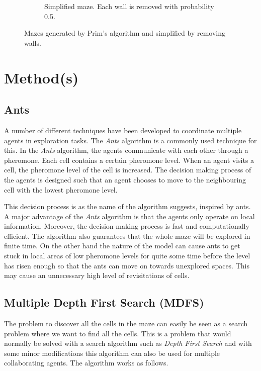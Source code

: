 \documentclass{article}
\begin{document}
\begin{figure}[H]
\begin{subfigure}[b]{0.3\textwidth}
        \caption{Simplified maze. Each wall is removed with probability 0.5.}
    \end{subfigure}
    \caption{Mazes generated by Prim's algorithm and simplified by removing
    walls.}
\end{figure}

\section{Method(s)}

\subsection{Ants}
A number of different techniques have been developed to coordinate multiple
agents in exploration tasks. The \textit{Ants} algorithm is a commonly used
technique for this. In the \textit{Ants} algorithm, the agents communicate with
each other through a pheromone. Each cell contains a certain
pheromone level. When an agent visits a cell, the pheromone level of the cell is
increased. The decision making process of the agents is designed such that an
agent chooses to move to the neighbouring cell with the lowest pheromone level.

This decision process is as the name of the algorithm suggests, inspired by
ants. A major advantage of the \textit{Ants} algorithm is that the
agents only operate on local information. Moreover, the decision making process is
fast and computationally efficient. The algorithm also guarantees that the whole
maze will be explored in finite time. On the other hand the nature of the model
can cause ants to get stuck in local areas of low pheromone levels for quite
some time before the level has risen enough so that the ants can move on towards
unexplored spaces. This may cause an unnecessary high level of revisitations of cells.

\subsection{Multiple Depth First Search (MDFS)}
The problem to discover all the cells in the maze can easily be seen as a search
problem where we want to find all the cells. This is a problem that would
normally be solved with a search algorithm such as \textit{Depth First Search}
and with some minor modifications this algorithm can also be used for multiple
collaborating agents. The algorithm works as follows.
\end{document}
